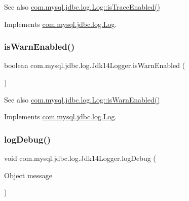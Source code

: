 \begin{DoxySeeAlso}{See also}
\mbox{\hyperlink{interfacecom_1_1mysql_1_1jdbc_1_1log_1_1_log_a821407c0c861bbb9de4618617e2fa519}{com.\+mysql.\+jdbc.\+log.\+Log\+::is\+Trace\+Enabled()}} 
\end{DoxySeeAlso}


Implements \mbox{\hyperlink{interfacecom_1_1mysql_1_1jdbc_1_1log_1_1_log_a821407c0c861bbb9de4618617e2fa519}{com.\+mysql.\+jdbc.\+log.\+Log}}.

\mbox{\label{classcom_1_1mysql_1_1jdbc_1_1log_1_1_jdk14_logger_a70b246a328418f6a6f380b8f839fdf44}} 
\subsubsection{\texorpdfstring{is\+Warn\+Enabled()}{isWarnEnabled()}}
{\footnotesize\ttfamily boolean com.\+mysql.\+jdbc.\+log.\+Jdk14\+Logger.\+is\+Warn\+Enabled (\begin{DoxyParamCaption}{ }\end{DoxyParamCaption})}

\begin{DoxySeeAlso}{See also}
\mbox{\hyperlink{interfacecom_1_1mysql_1_1jdbc_1_1log_1_1_log_ae786b79391cf28f119aa7b12226b7e2b}{com.\+mysql.\+jdbc.\+log.\+Log\+::is\+Warn\+Enabled()}} 
\end{DoxySeeAlso}


Implements \mbox{\hyperlink{interfacecom_1_1mysql_1_1jdbc_1_1log_1_1_log_ae786b79391cf28f119aa7b12226b7e2b}{com.\+mysql.\+jdbc.\+log.\+Log}}.

\mbox{\label{classcom_1_1mysql_1_1jdbc_1_1log_1_1_jdk14_logger_a0eacb4fd20d546869f80b5ecd9e8998c}} 
\subsubsection{\texorpdfstring{log\+Debug()}{logDebug()}\hspace{0.1cm}{\footnotesize\ttfamily [1/2]}}
{\footnotesize\ttfamily void com.\+mysql.\+jdbc.\+log.\+Jdk14\+Logger.\+log\+Debug (\begin{DoxyParamCaption}\item[{Object}]{message }\end{DoxyParamCaption})}

